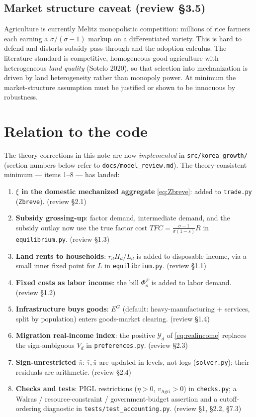 \documentclass[11pt]{article}
\begin{document}
\subsection{Market structure caveat (review \S3.5)}
Agriculture is currently Melitz monopolistic competition: millions of rice farmers each
earning a $\sigma/(\sigma-1)$ markup on a differentiated variety. This is hard to defend
and distorts subsidy pass-through and the adoption calculus. The literature standard is
competitive, homogeneous-good agriculture with heterogeneous \emph{land quality} (Sotelo
2020), so that selection into mechanization is driven by land heterogeneity rather than
monopoly power. At minimum the market-structure assumption must be justified or shown to be
innocuous by robustness.

\section{Relation to the code}\label{sec:discrepancies}
The theory corrections in this note are now \emph{implemented} in \texttt{src/korea\_growth/}
(section numbers below refer to \texttt{docs/model\_review.md}). The theory-consistent
minimum --- items 1--8 --- has landed:
\begin{enumerate}[leftmargin=1.5em]
\item \textbf{$\xi$ in the domestic mechanized aggregate} \eqref{eq:Zbreve}: added to
      \texttt{trade.py} (\texttt{Zbreve}). (review \S2.1)
\item \textbf{Subsidy grossing-up}: factor demand, intermediate demand, and the subsidy
      outlay now use the true factor cost $TFC=\frac{\sigma-1}{\sigma(1-s)}R$ in
      \texttt{equilibrium.py}. (review \S1.3)
\item \textbf{Land rents to households}: $r_{d}H_{d}/L_{d}$ is added to disposable income,
      via a small inner fixed point for $L$ in \texttt{equilibrium.py}. (review \S1.1)
\item \textbf{Fixed costs as labor income}: the bill $\Phi^{F}_{o}$ is added to labor
      demand. (review \S1.2)
\item \textbf{Infrastructure buys goods}: $E^{G}$ (default: heavy-manufacturing $+$
      services, split by population) enters goods-market clearing. (review \S1.4)
\item \textbf{Migration real-income index}: the positive $\mathcal{Y}_{d}$ of
      \eqref{eq:realincome} replaces the sign-ambiguous $V_d$ in \texttt{preferences.py}.
      (review \S2.3)
\item \textbf{Sign-unrestricted $\bar\pi$}: $\bar\tau,\bar\pi$ are updated in levels, not
      logs (\texttt{solver.py}); their residuals are arithmetic. (review \S2.4)
\item \textbf{Checks and tests}: PIGL restrictions ($\eta>0$, $v_{\mathrm{Agri}}>0$) in
      \texttt{checks.py}; a Walras / resource-constraint / government-budget assertion and
      a cutoff-ordering diagnostic in \texttt{tests/test\_accounting.py}. (review \S1,
      \S2.2, \S7.3)
\end{enumerate}
\end{document}

